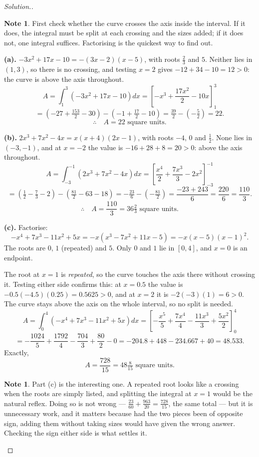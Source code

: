 \documentclass[11pt,a4paper]{article}
\theoremstyle{definition}
\newtheorem{note}[thm]{Note}
\newenvironment{solution}
  {\renewcommand{\qedsymbol}{}\begin{proof}[\textit{Solution}.]}
  {\end{proof}}
\begin{document}
\begin{solution}
\begin{note}
First check whether the curve crosses the axis inside the interval. If it does, the
integral must be split at each crossing and the sizes added; if it does not, one
integral suffices. Factorising is the quickest way to find out.
\end{note}

\textbf{(a).} $-3x^2+17x-10=-(3x-2)(x-5)$, with roots $\frac{2}{3}$ and $5$. Neither
lies in $(1,3)$, so there is no crossing, and testing $x=2$ gives
$-12+34-10=12>0$: the curve is above the axis throughout.
$$A=\int_1^3\left(-3x^2+17x-10\right)dx=\left[-x^3+\frac{17x^2}{2}-10x\right]_1^3$$
$$=\left(-27+\tfrac{153}{2}-30\right)-\left(-1+\tfrac{17}{2}-10\right)
=\tfrac{39}{2}-\left(-\tfrac{5}{2}\right)=22.$$
$$\therefore\quad A=22 \text{ square units}.$$

\textbf{(b).} $2x^3+7x^2-4x=x(x+4)(2x-1)$, with roots $-4$, $0$ and $\frac{1}{2}$. None
lies in $(-3,-1)$, and at $x=-2$ the value is $-16+28+8=20>0$: above the axis
throughout.
$$A=\int_{-3}^{-1}\left(2x^3+7x^2-4x\right)dx
=\left[\frac{x^4}{2}+\frac{7x^3}{3}-2x^2\right]_{-3}^{-1}$$
$$=\left(\tfrac{1}{2}-\tfrac{7}{3}-2\right)
-\left(\tfrac{81}{2}-63-18\right)=-\tfrac{23}{6}-\left(-\tfrac{81}{2}\right)
=\frac{-23+243}{6}=\frac{220}{6}=\frac{110}{3}.$$
$$\therefore\quad A=\frac{110}{3}=36\tfrac{2}{3} \text{ square units}.$$

\textbf{(c).} Factorise:
$$-x^4+7x^3-11x^2+5x=-x\left(x^3-7x^2+11x-5\right)=-x(x-5)(x-1)^2.$$
The roots are $0$, $1$ (repeated) and $5$. Only $0$ and $1$ lie in $[0,4]$, and $x=0$
is an endpoint.

The root at $x=1$ is \emph{repeated}, so the curve touches the axis there without
crossing it. Testing either side confirms this: at $x=0.5$ the value is
$-0.5(-4.5)(0.25)=0.5625>0$, and at $x=2$ it is $-2(-3)(1)=6>0$. The curve stays above
the axis on the whole interval, so no split is needed.
$$A=\int_0^4\left(-x^4+7x^3-11x^2+5x\right)dx
=\left[-\frac{x^5}{5}+\frac{7x^4}{4}-\frac{11x^3}{3}+\frac{5x^2}{2}\right]_0^4$$
$$=-\frac{1024}{5}+\frac{1792}{4}-\frac{704}{3}+\frac{80}{2}-0
=-204.8+448-234.667+40=48.533.$$
Exactly,
$$A=\frac{728}{15}=48\tfrac{8}{15} \text{ square units}.$$

\begin{note}
Part (c) is the interesting one. A repeated root looks like a crossing when the roots
are simply listed, and splitting the integral at $x=1$ would be the natural reflex.
Doing so is not wrong --- $\frac{23}{60}+\frac{963}{20}=\frac{728}{15}$, the same total
--- but it is unnecessary work, and it matters because had the two pieces been of
opposite sign, adding them without taking sizes would have given the wrong answer.
Checking the sign either side is what settles it.
\end{note}
\end{solution}
\end{document}
